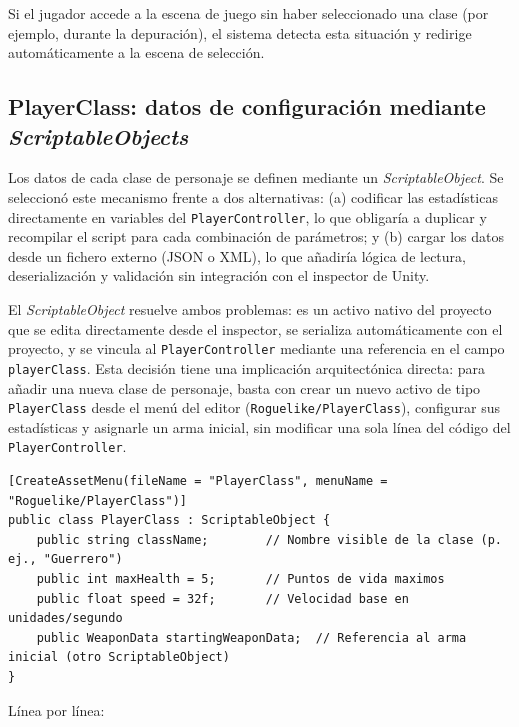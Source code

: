 Si el jugador accede a la escena de juego sin haber seleccionado una clase (por ejemplo, durante la depuración), el sistema detecta esta situación y redirige automáticamente a la escena de selección.

\subsection{PlayerClass: datos de configuración mediante \textit{ScriptableObjects}}


Los datos de cada clase de personaje se definen mediante un \textit{ScriptableObject}. Se seleccionó este mecanismo frente a dos alternativas: (a) codificar las estadísticas directamente en variables del \texttt{PlayerController}, lo que obligaría a duplicar y recompilar el script para cada combinación de parámetros; y (b) cargar los datos desde un fichero externo (JSON o XML), lo que añadiría lógica de lectura, deserialización y validación sin integración con el inspector de Unity.

El \textit{ScriptableObject} resuelve ambos problemas: es un activo nativo del proyecto que se edita directamente desde el inspector, se serializa automáticamente con el proyecto, y se vincula al \texttt{PlayerController} mediante una referencia en el campo \texttt{playerClass}. Esta decisión tiene una implicación arquitectónica directa: para añadir una nueva clase de personaje, basta con crear un nuevo activo de tipo \texttt{PlayerClass} desde el menú del editor (\texttt{Roguelike/PlayerClass}), configurar sus estadísticas y asignarle un arma inicial, sin modificar una sola línea del código del \texttt{PlayerController}.

\begin{lstlisting}
[CreateAssetMenu(fileName = "PlayerClass", menuName = "Roguelike/PlayerClass")]
public class PlayerClass : ScriptableObject {
    public string className;        // Nombre visible de la clase (p. ej., "Guerrero")
    public int maxHealth = 5;       // Puntos de vida maximos
    public float speed = 32f;       // Velocidad base en unidades/segundo
    public WeaponData startingWeaponData;  // Referencia al arma inicial (otro ScriptableObject)
}
\end{lstlisting}


Línea por línea:

